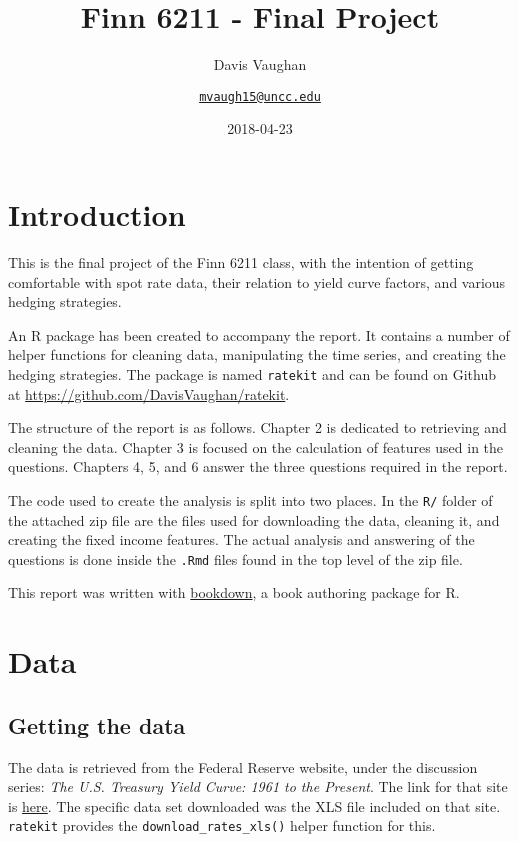 \documentclass[openany]{book}
\title{Finn 6211 - Final Project}
\subtitle{Davis Vaughan}
\author{\href{mailto:mvaugh15@uncc.edu}{\nolinkurl{mvaugh15@uncc.edu}}}
\date{2018-04-23}
\theoremstyle{definition}
\theoremstyle{definition}
\theoremstyle{definition}
\theoremstyle{remark}
\begin{document}
\maketitle

{
\setcounter{tocdepth}{1}
\tableofcontents
}
\hypertarget{titlepage}{%
\chapter{Introduction}\label{titlepage}}

This is the final project of the Finn 6211 class, with the intention of
getting comfortable with spot rate data, their relation to yield curve
factors, and various hedging strategies.

An R package has been created to accompany the report. It contains a
number of helper functions for cleaning data, manipulating the time
series, and creating the hedging strategies. The package is named
\texttt{ratekit} and can be found on Github at
\url{https://github.com/DavisVaughan/ratekit}.

The structure of the report is as follows. Chapter 2 is dedicated to
retrieving and cleaning the data. Chapter 3 is focused on the
calculation of features used in the questions. Chapters 4, 5, and 6
answer the three questions required in the report.

The code used to create the analysis is split into two places. In the
\texttt{R/} folder of the attached zip file are the files used for
downloading the data, cleaning it, and creating the fixed income
features. The actual analysis and answering of the questions is done
inside the \texttt{.Rmd} files found in the top level of the zip file.

This report was written with
\href{https://bookdown.org/yihui/bookdown/}{bookdown}, a book authoring
package for R.

\small

\normalsize

\hypertarget{data}{%
\chapter{Data}\label{data}}

\hypertarget{retrieve}{%
\section{Getting the data}\label{retrieve}}

The data is retrieved from the Federal Reserve website, under the
discussion series: \emph{The U.S. Treasury Yield Curve: 1961 to the
Present}. The link for that site is
\href{https://www.federalreserve.gov/pubs/feds/2006/200628/200628abs.html}{here}.
The specific data set downloaded was the XLS file included on that site.
\texttt{ratekit} provides the \texttt{download\_rates\_xls()} helper
function for this.
\end{document}

